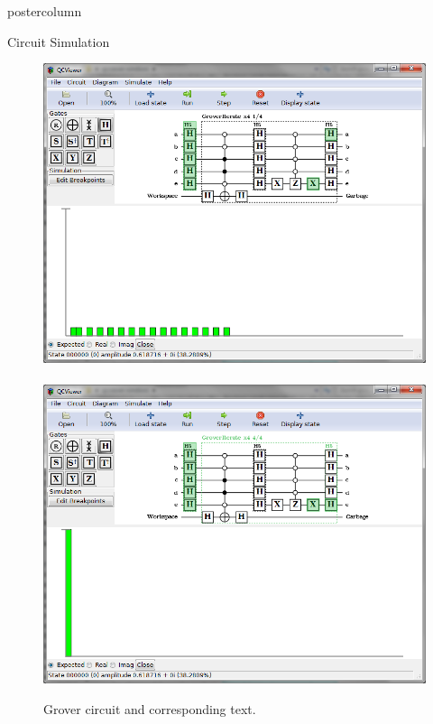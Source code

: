 \documentclass[final]{beamer} %
\begin{document}
\begin{frame}{}
\begin{columns}
\begin{column}{.33\textwidth}
\begin{beamercolorbox}[center,wd=\textwidth]{postercolumn}
\begin{minipage}[T]{.95\textwidth}
\begin{block}{\large Circuit Simulation}
                    \centering 
		\begin{figure}[!htbp]
		  \centering
		  \includegraphics[width=7in]{figures/Grover_Simulate1.png} \ \  \includegraphics[width=7in]{figures/Grover_Simulate2.png}
		  \caption{Grover circuit and corresponding text.}
		\end{figure}

           \end{block}


\end{minipage}
\end{beamercolorbox}
\end{column}
\end{columns}
\end{frame}
\end{document}
